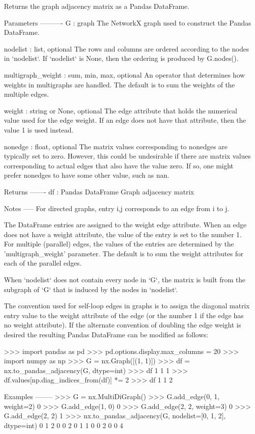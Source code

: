 \begin{DoxyVerb}Returns the graph adjacency matrix as a Pandas DataFrame.

Parameters
----------
G : graph
    The NetworkX graph used to construct the Pandas DataFrame.

nodelist : list, optional
   The rows and columns are ordered according to the nodes in `nodelist`.
   If `nodelist` is None, then the ordering is produced by G.nodes().

multigraph_weight : {sum, min, max}, optional
    An operator that determines how weights in multigraphs are handled.
    The default is to sum the weights of the multiple edges.

weight : string or None, optional
    The edge attribute that holds the numerical value used for
    the edge weight.  If an edge does not have that attribute, then the
    value 1 is used instead.

nonedge : float, optional
    The matrix values corresponding to nonedges are typically set to zero.
    However, this could be undesirable if there are matrix values
    corresponding to actual edges that also have the value zero. If so,
    one might prefer nonedges to have some other value, such as nan.

Returns
-------
df : Pandas DataFrame
   Graph adjacency matrix

Notes
-----
For directed graphs, entry i,j corresponds to an edge from i to j.

The DataFrame entries are assigned to the weight edge attribute. When
an edge does not have a weight attribute, the value of the entry is set to
the number 1.  For multiple (parallel) edges, the values of the entries
are determined by the 'multigraph_weight' parameter.  The default is to
sum the weight attributes for each of the parallel edges.

When `nodelist` does not contain every node in `G`, the matrix is built
from the subgraph of `G` that is induced by the nodes in `nodelist`.

The convention used for self-loop edges in graphs is to assign the
diagonal matrix entry value to the weight attribute of the edge
(or the number 1 if the edge has no weight attribute).  If the
alternate convention of doubling the edge weight is desired the
resulting Pandas DataFrame can be modified as follows:

>>> import pandas as pd
>>> pd.options.display.max_columns = 20
>>> import numpy as np
>>> G = nx.Graph([(1, 1)])
>>> df = nx.to_pandas_adjacency(G, dtype=int)
>>> df
   1
1  1
>>> df.values[np.diag_indices_from(df)] *= 2
>>> df
   1
1  2

Examples
--------
>>> G = nx.MultiDiGraph()
>>> G.add_edge(0, 1, weight=2)
0
>>> G.add_edge(1, 0)
0
>>> G.add_edge(2, 2, weight=3)
0
>>> G.add_edge(2, 2)
1
>>> nx.to_pandas_adjacency(G, nodelist=[0, 1, 2], dtype=int)
   0  1  2
0  0  2  0
1  1  0  0
2  0  0  4\end{DoxyVerb}
